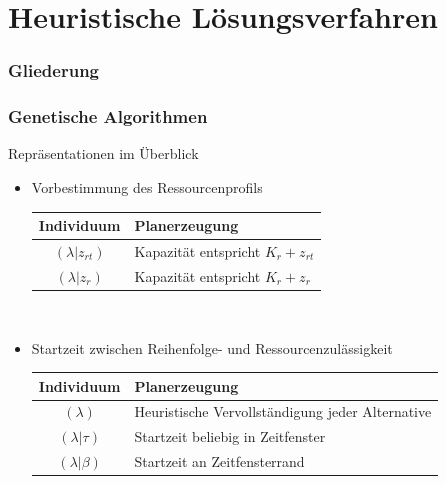 
\section{Heuristische Lösungsverfahren}

\begin{frame}[noframenumbering]
\frametitle{Gliederung}
\end{frame}

\begin{frame}
\frametitle{Genetische Algorithmen}
Repräsentationen im Überblick
\begin{itemize}	
	\item \small{Vorbestimmung des Ressourcenprofils}\\[2mm]
	\begin{small}
		\begin{tabular}{cp{7.5cm}}
			\hline
			Individuum & Planerzeugung\\
			\hline
			$(\lambda|z_{rt})$ & Kapazität entspricht $K_r+z_{rt}$\\
			$(\lambda|z_r)$ & Kapazität entspricht $K_r+z_{r}$\\
		\end{tabular}
	\end{small}\\[4mm]
	
	\item \small{Startzeit zwischen Reihenfolge- und Ressourcenzulässigkeit}\\[2mm]
	\begin{small}
		\begin{tabular}{cp{7.5cm}}
			\hline
			Individuum & Planerzeugung\\
			\hline
			$(\lambda)$ & Heuristische Vervollständigung jeder Alternative\\	
			$(\lambda|\tau)$& Startzeit beliebig in Zeitfenster\\
			$(\lambda|\beta)$& Startzeit an Zeitfensterrand\\
		\end{tabular}
	\end{small}	
\end{itemize}
\end{frame}


